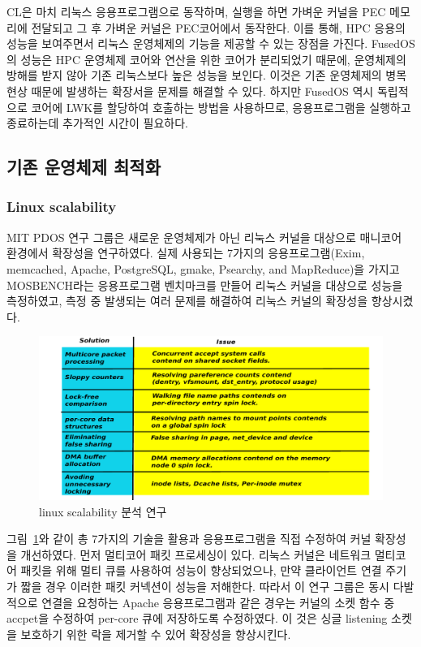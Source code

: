 CL은 마치 리눅스 응용프로그램으로 동작하며, 실행을 하면 가벼운 커널을 PEC 메모리에 
전달되고 그 후 가벼운 커널은 PEC코어에서 동작한다.
이를 통해, HPC 응용의 성능을 보여주면서 리눅스 운영체제의 기능을 
제공할 수 있는 장점을 가진다. 
FusedOS의 성능은 HPC 운영체제 코어와 연산을 위한 코어가 분리되었기 때문에, 운영체제의 
방해를 받지 않아 기존 리눅스보다 높은 성능을 보인다.
이것은 기존 운영체제의 병목현상 때문에 발생하는 확장서을 문제를 해결할 수 있다.   
하지만 FusedOS 역시 독립적으로 코어에 LWK를 할당하여 호출하는 방법을 사용하므로,  
응용프로그램을 실행하고 종료하는데 추가적인 시간이 필요하다. 

\subsection{기존 운영체제 최적화}

\subsubsection{Linux scalability}

MIT PDOS 연구 그룹은 새로운 운영체제가 아닌 리눅스 커널을 대상으로 매니코어 환경에서 확장성을 연구하였다.
실제 사용되는 7가지의 응용프로그램(Exim, memcached, Apache, PostgreSQL, gmake, Psearchy, and
MapReduce)을 가지고 MOSBENCH라는 응용프로그램 벤치마크를 만들어 리눅스 커널을 
대상으로 성능을 측정하였고, 측정 중 발생되는 여러 문제를 해결하여 리눅스 커널의 확장성을 향상시켰다.

\begin{figure}[h!]
    \centering
    \includegraphics[width=1\textwidth]{fig/linux/linux}
    \caption{linux scalability 분석 연구}
  \label{fig:linux}
\end{figure}


그림~\ref{fig:linux}와 같이 총 7가지의 기술을 활용과 응용프로그램을 직접 수정하여 커널 확장성을 개선하였다.
먼저 멀티코어 패킷 프로세싱이 있다. 
리눅스 커널은 네트워크 멀티코어 패킷을 위해 멀티 큐를 사용하여 성능이 향상되었으나, 만약 클라이언트 
연결 주기가 짧을 경우 이러한 패킷 커넥션이 성능을 저해한다.
따라서 이 연구 그룹은 동시 다발적으로 연결을 요청하는 Apache 응용프로그램과 같은 경우는 
커널의 소켓 함수 중 accpet을 수정하여 per-core 큐에 저장하도록 수정하였다. 
이 것은 싱글 listening 소켓을 보호하기 위한 락을 제거할 수 있어 확장성을 향상시킨다.

